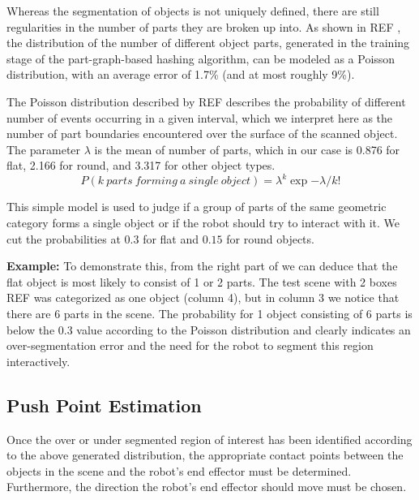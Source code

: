 Whereas the segmentation of objects is not uniquely defined, there are still regularities in the number of parts they are broken up into.
As shown in REF%
, the distribution of the number of different object parts, generated in the training stage of the part-graph-based hashing algorithm, can be modeled as a Poisson distribution,
with an average error of 1.7\% (and at most roughly 9\%).


The Poisson distribution described by REF%
describes the probability of different number of events occurring
in a given interval, which we interpret here as the number of part boundaries encountered over the surface of the scanned object.
The parameter $\lambda$ is the mean of number of parts, which in our case is 0.876 for flat, 2.166 for round, and 3.317 for other object types.
\begin{equation}
\label{eq:poisson}
P(k~parts~forming~a~single~object) = \lambda^k \exp{-\lambda} / k!
\end{equation}

This simple model is used to judge if a group of parts of the same geometric category forms a single object or if the robot
should try to interact with it. We cut the probabilities at $0.3$ for flat and $0.15$ for round objects.

\textbf{Example:} To demonstrate this, from the right part of %
we can deduce that the 
flat object is most likely to consist of 1 or 2 parts. The test scene with 
2 boxes REF %
was categorized as one object (column 4), but in column
3 we notice that there are 6 parts in the scene. The probability for 1 object consisting of 6 parts is below the $0.3$ value
according to the Poisson distribution and clearly indicates an over-segmentation 
error and the need for the robot to segment this region interactively.

\subsection{Push Point Estimation}
\label{sec:push-point}
Once the over or under segmented region of interest has been identified 
according to the above generated distribution, the  appropriate contact
points  between the objects in   the   scene  and   the   robot's   end   
effector  must   be determined. Furthermore, the  direction   the robot's  end
effector should move must be chosen.


